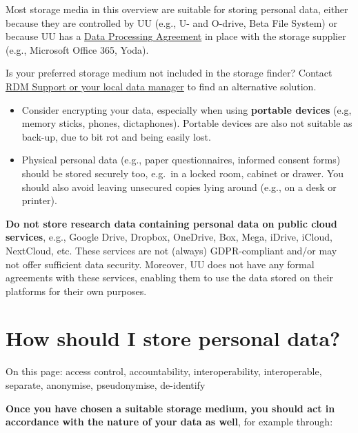 \documentclass[
]{book}
\providecommand{\tightlist}{%
  \setlength{\itemsep}{0pt}\setlength{\parskip}{0pt}}
\begin{document}
Most storage media in this overview are suitable for storing personal data, either
because they are controlled by UU (e.g., U- and O-drive, Beta File System) or
because UU has a \protect\hyperlink{data-processing-agreement}{Data Processing Agreement} in
place with the storage supplier (e.g., Microsoft Office 365, Yoda).

Is your preferred storage medium not included in the storage finder? Contact
\protect\hyperlink{support}{RDM Support or your local data manager} to find an alternative solution.

\begin{itemize}
\tightlist
\item
  Consider encrypting your data, especially when using \textbf{portable devices}
  (e.g, memory sticks, phones, dictaphones). Portable devices are also not suitable as back-up,
  due to bit rot and being easily lost.
\item
  Physical personal data (e.g., paper questionnaires, informed consent forms)
  should be stored securely too, e.g.~in a locked room, cabinet or drawer. You
  should also avoid leaving unsecured copies lying around (e.g., on a desk or printer).
\end{itemize}

\textbf{Do not store research data containing personal data on public cloud services},
e.g., Google Drive, Dropbox, OneDrive, Box, Mega, iDrive, iCloud, NextCloud, etc.
These services are not (always) GDPR-compliant and/or may not offer sufficient
data security. Moreover, UU does not have any formal agreements with these
services, enabling them to use the data stored on their platforms for their own
purposes.

\hypertarget{data-storage-how}{%
\section{How should I store personal data?}\label{data-storage-how}}

On this page: access control, accountability, interoperability, interoperable,
separate, anonymise, pseudonymise, de-identify

\textbf{Once you have chosen a suitable storage medium, you should act in accordance
with the nature of your data as well}, for example through:
\end{document}
